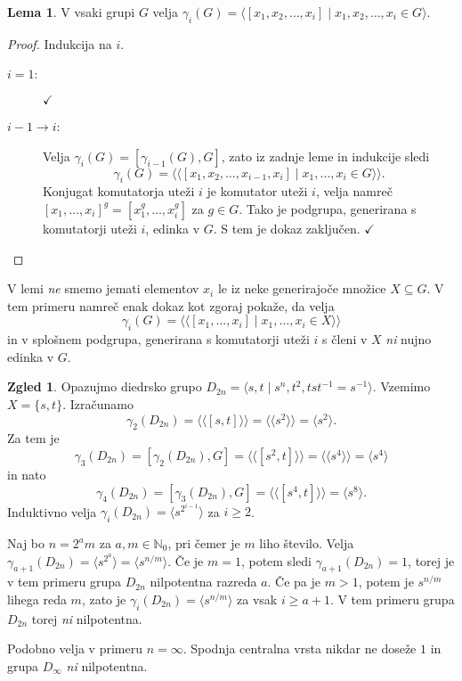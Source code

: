 \documentclass[11pt]{book}
\renewcommand{\llangle}{\langle\langle}
\renewcommand{\rrangle}{\rangle\rangle}
\def\NN{\mathbb{N}}
\def\kljuka{$\checkmark$}
\theoremstyle{definition}
\theoremstyle{zgled}
\newtheorem*{zgled}{Zgled}
\theoremstyle{odprtproblem}
\theoremstyle{domacanaloga}
\newenvironment{dokaz}
    {\color{siva}\begin{proof}}
    {\end{proof}}
\theoremstyle{izrek}
\newtheorem*{lema}{Lema}
\begin{document}
\begin{lema}
V vsaki grupi $G$ velja $\gamma_i(G) = \langle [x_1, x_2, \dots, x_i] \mid x_1, x_2, \dots, x_i \in G \rangle$.
\end{lema}

\begin{dokaz}
Indukcija na $i$.
\begin{description}
    \item[$i = 1$:] \kljuka

    \item[$i-1 \to i$:] Velja $\gamma_i(G) = [\gamma_{i-1}(G), G]$, zato iz zadnje leme in indukcije sledi
    \[
    \gamma_i(G) = \llangle [x_1, x_2, \dots, x_{i-1}, x_i] \mid x_1, \dots, x_i \in G \rrangle.
    \]
    Konjugat komutatorja uteži $i$ je komutator uteži $i$, velja namreč $[x_1, \dots, x_i]^g = [x_1^g, \dots, x_i^g]$ za $g \in G$. Tako je podgrupa, generirana s komutatorji uteži $i$, edinka v $G$. S tem je dokaz zaključen. \kljuka
\end{description}
\end{dokaz}

V lemi {\em ne} smemo jemati elementov $x_i$ le iz neke generirajoče množice $X \subseteq G$. V tem primeru namreč enak dokaz kot zgoraj pokaže, da velja
\[
\gamma_i(G) = \llangle [x_1, \dots, x_i] \mid x_1, \dots, x_i \in X \rrangle
\]
in v splošnem podgrupa, generirana s komutatorji uteži $i$ s členi v $X$ {\em ni} nujno edinka v $G$.

\begin{zgled}
Opazujmo diedrsko grupo $D_{2n} = \langle s, t \mid s^n, t^2, t s t^{-1} = s^{-1} \rangle$. Vzemimo $X = \{ s, t \}$. Izračunamo
\[
\gamma_2(D_{2n}) = \llangle [s,t] \rrangle = \llangle s^2 \rrangle =
\langle s^2  \rangle.
\]
Za tem je
\[
\gamma_3(D_{2n}) = [\gamma_2(D_{2n}), G] =
\llangle [s^2, t] \rrangle = \llangle s^4 \rrangle = \langle s^4 \rangle
\]
in nato
\[
\gamma_4(D_{2n}) = [\gamma_3(D_{2n}), G] =
\llangle [s^4, t] \rrangle = \langle s^8 \rangle.
\]
Induktivno velja $\gamma_i(D_{2n}) = \langle s^{2^{i-1}} \rangle$ za $i \geq 2$.

Naj bo $n = 2^a m$ za $a,m \in \NN_0$, pri čemer je $m$ liho število. Velja $\gamma_{a+1}(D_{2n}) = \langle s^{2^a} \rangle = \langle s^{n/m} \rangle$. Če je $m = 1$, potem sledi $\gamma_{a+1}(D_{2n}) = 1$, torej je v tem primeru grupa $D_{2n}$ nilpotentna razreda $a$. Če pa je $m > 1$, potem je $s^{n/m}$ lihega reda $m$, zato je $\gamma_{i}(D_{2n}) = \langle s^{n/m} \rangle$ za vsak $i \geq a+1$. V tem primeru grupa $D_{2n}$ torej {\em ni} nilpotentna.

Podobno velja v primeru $n = \infty$. Spodnja centralna vrsta nikdar ne doseže $1$ in grupa $D_\infty$ {\em ni} nilpotentna.
\end{zgled}
\end{document}
